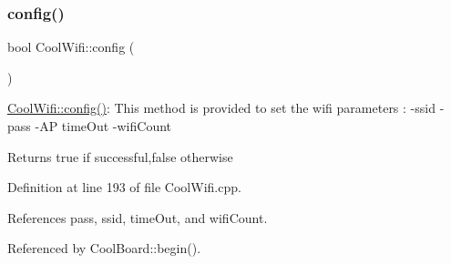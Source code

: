 \subsubsection{\texorpdfstring{config()}{config()}\hspace{0.1cm}{\footnotesize\ttfamily [1/2]}}
{\footnotesize\ttfamily bool Cool\+Wifi\+::config (\begin{DoxyParamCaption}{ }\end{DoxyParamCaption})}

\hyperlink{classCoolWifi_a4eb2f6b9b09dd588964b88b6c70122c0}{Cool\+Wifi\+::config()}\+: This method is provided to set the wifi parameters \+: -\/ssid -\/pass -\/\+AP time\+Out -\/wifi\+Count

\begin{DoxyReturn}{Returns}
true if successful,false otherwise 
\end{DoxyReturn}


Definition at line 193 of file Cool\+Wifi.\+cpp.



References pass, ssid, time\+Out, and wifi\+Count.



Referenced by Cool\+Board\+::begin().


